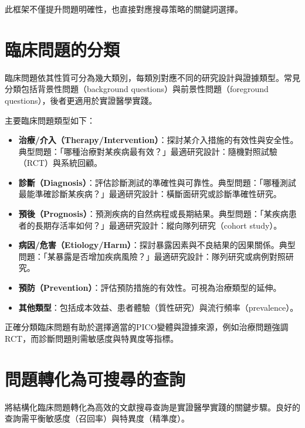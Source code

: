 此框架不僅提升問題明確性，也直接對應搜尋策略的關鍵詞選擇。

\section{臨床問題的分類}

臨床問題依其性質可分為幾大類別，每類別對應不同的研究設計與證據類型。常見分類包括背景性問題（background questions）與前景性問題（foreground questions），後者更適用於實證醫學實踐。

主要臨床問題類型如下：
\begin{itemize}
    \item \textbf{治療/介入（Therapy/Intervention）}：探討某介入措施的有效性與安全性。典型問題：「哪種治療對某疾病最有效？」最適研究設計：隨機對照試驗（RCT）與系統回顧。
    \item \textbf{診斷（Diagnosis）}：評估診斷測試的準確性與可靠性。典型問題：「哪種測試最能準確診斷某疾病？」最適研究設計：橫斷面研究或診斷準確性研究。
    \item \textbf{預後（Prognosis）}：預測疾病的自然病程或長期結果。典型問題：「某疾病患者的長期存活率如何？」最適研究設計：縱向隊列研究（cohort study）。
    \item \textbf{病因/危害（Etiology/Harm）}：探討暴露因素與不良結果的因果關係。典型問題：「某暴露是否增加疾病風險？」最適研究設計：隊列研究或病例對照研究。
    \item \textbf{預防（Prevention）}：評估預防措施的有效性。可視為治療類型的延伸。
    \item \textbf{其他類型}：包括成本效益、患者體驗（質性研究）與流行頻率（prevalence）。
\end{itemize}

正確分類臨床問題有助於選擇適當的PICO變體與證據來源，例如治療問題強調RCT，而診斷問題則需敏感度與特異度等指標。

\section{問題轉化為可搜尋的查詢}

將結構化臨床問題轉化為高效的文獻搜尋查詢是實證醫學實踐的關鍵步驟。良好的查詢需平衡敏感度（召回率）與特異度（精準度）。

